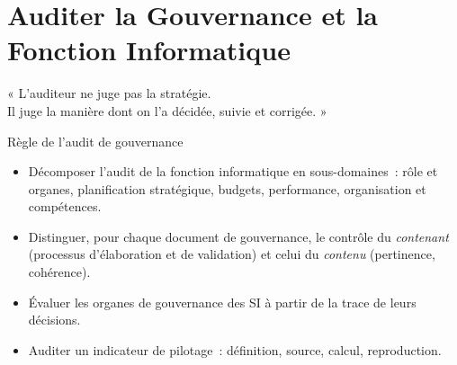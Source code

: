 
\chapter{Auditer la Gouvernance et la Fonction Informatique}
\label{chap:audit-gouvernance}

\epigraph{%
    « L'auditeur ne juge pas la stratégie.\\
    Il juge la manière dont on l'a décidée, suivie et corrigée. »%
}{Règle de l'audit de gouvernance}


\begin{boxobjectifs}
\begin{itemize}
    \item Décomposer l'audit de la fonction informatique en sous-domaines~:
          rôle et organes, planification stratégique, budgets, performance,
          organisation et compétences.
    \item Distinguer, pour chaque document de gouvernance, le contrôle du
          \emph{contenant} (processus d'élaboration et de validation) et
          celui du \emph{contenu} (pertinence, cohérence).
    \item Évaluer les organes de gouvernance des SI à partir de la trace de
          leurs décisions.
    \item Auditer un indicateur de pilotage~: définition, source, calcul,
          reproduction.
\end{itemize}
\end{boxobjectifs}

